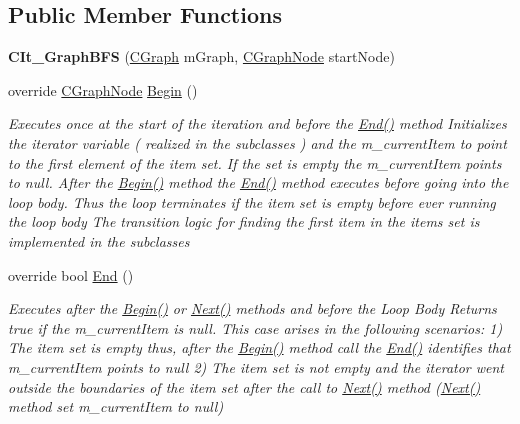 \subsection*{Public Member Functions}
\begin{DoxyCompactItemize}
\item 
\hypertarget{class_graph_library_1_1_c_it___graph_b_f_s_a2d8f7a4ef8361ac7d0093db4be305169}{}{\bfseries C\+It\+\_\+\+Graph\+B\+F\+S} (\hyperlink{class_graph_library_1_1_c_graph}{C\+Graph} m\+Graph, \hyperlink{class_graph_library_1_1_c_graph_node}{C\+Graph\+Node} start\+Node)\label{class_graph_library_1_1_c_it___graph_b_f_s_a2d8f7a4ef8361ac7d0093db4be305169}

\item 
override \hyperlink{class_graph_library_1_1_c_graph_node}{C\+Graph\+Node} \hyperlink{class_graph_library_1_1_c_it___graph_b_f_s_aa96b96be6229e08e45b85fcd0130445d}{Begin} ()
\begin{DoxyCompactList}\small\item\em Executes once at the start of the iteration and before the \hyperlink{class_graph_library_1_1_c_it___graph_b_f_s_a46418dc24ecf2e8ad3aa3541a70d06b2}{End()} method Initializes the iterator variable ( realized in the subclasses ) and the m\+\_\+current\+Item to point to the first element of the item set. If the set is empty the m\+\_\+current\+Item points to null. After the \hyperlink{class_graph_library_1_1_c_it___graph_b_f_s_aa96b96be6229e08e45b85fcd0130445d}{Begin()} method the \hyperlink{class_graph_library_1_1_c_it___graph_b_f_s_a46418dc24ecf2e8ad3aa3541a70d06b2}{End()} method executes before going into the loop body. Thus the loop terminates if the item set is empty before ever running the loop body The transition logic for finding the first item in the items set is implemented in the subclasses \end{DoxyCompactList}\item 
override bool \hyperlink{class_graph_library_1_1_c_it___graph_b_f_s_a46418dc24ecf2e8ad3aa3541a70d06b2}{End} ()
\begin{DoxyCompactList}\small\item\em Executes after the \hyperlink{class_graph_library_1_1_c_it___graph_b_f_s_aa96b96be6229e08e45b85fcd0130445d}{Begin()} or \hyperlink{class_graph_library_1_1_c_it___graph_b_f_s_ab836a3c5caca3c8d63d56827b677a243}{Next()} methods and before the Loop Body Returns true if the m\+\_\+current\+Item is null. This case arises in the following scenarios\+: 1) The item set is empty thus, after the \hyperlink{class_graph_library_1_1_c_it___graph_b_f_s_aa96b96be6229e08e45b85fcd0130445d}{Begin()} method call the \hyperlink{class_graph_library_1_1_c_it___graph_b_f_s_a46418dc24ecf2e8ad3aa3541a70d06b2}{End()} identifies that m\+\_\+current\+Item points to null 2) The item set is not empty and the iterator went outside the boundaries of the item set after the call to \hyperlink{class_graph_library_1_1_c_it___graph_b_f_s_ab836a3c5caca3c8d63d56827b677a243}{Next()} method (\hyperlink{class_graph_library_1_1_c_it___graph_b_f_s_ab836a3c5caca3c8d63d56827b677a243}{Next()} method set m\+\_\+current\+Item to null) \end{DoxyCompactList}\item 

\end{DoxyCompactItemize}
